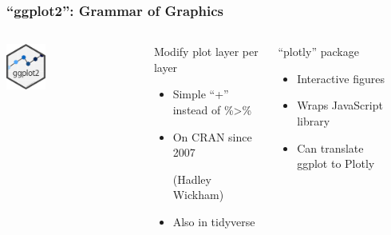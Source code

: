 \begin{frame}
	\frametitle{``ggplot2'': Grammar of Graphics}
	\begin{columns}
		\centering\includegraphics[width=0.3\textwidth]{../figs/ggplot2.png}
	
		\begin{block}{Modify plot layer per layer}
			\begin{itemize}
				\item Simple ``{\ttfamily +}'' instead of {\ttfamily \%>\%}
				\item On CRAN since 2007 
				
				(Hadley Wickham)
				\item Also in tidyverse
			\end{itemize}
		\end{block}
	
		\begin{block}{``plotly'' package}
			\begin{itemize}
				\item Interactive figures
				\item Wraps JavaScript library
				\item Can translate ggplot to Plotly
			\end{itemize}
		\end{block}
	
		\begin{example}
		\end{example}
	\end{columns}
	
\end{frame}

